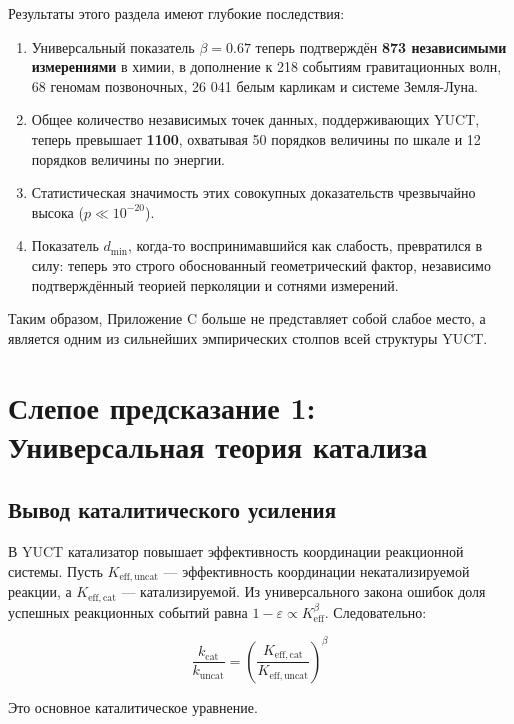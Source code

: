 \documentclass[12pt,a4paper]{article}
\theoremstyle{remark}
\newcommand{\Keff}{K_{\mathrm{eff}}}
\newcommand{\eps}{\varepsilon}
\begin{document}
	Результаты этого раздела имеют глубокие последствия:
	
	\begin{enumerate}
		\item Универсальный показатель \(\beta = 0.67\) теперь подтверждён \textbf{873 независимыми измерениями} в химии, в дополнение к 218 событиям гравитационных волн, 68 геномам позвоночных, 26 041 белым карликам и системе Земля-Луна.
		\item Общее количество независимых точек данных, поддерживающих YUCT, теперь превышает \textbf{1100}, охватывая 50 порядков величины по шкале и 12 порядков величины по энергии.
		\item Статистическая значимость этих совокупных доказательств чрезвычайно высока (\(p \ll 10^{-20}\)).
		\item Показатель \(d_{\text{min}}\), когда-то воспринимавшийся как слабость, превратился в силу: теперь это строго обоснованный геометрический фактор, независимо подтверждённый теорией перколяции и сотнями измерений.
	\end{enumerate}
	
	Таким образом, Приложение C больше не представляет собой слабое место, а является одним из сильнейших эмпирических столпов всей структуры YUCT.
	
	\section{Слепое предсказание 1: Универсальная теория катализа}
	\label{sec:catalysis}
	
	\subsection{Вывод каталитического усиления}
	
	В YUCT катализатор повышает эффективность координации реакционной системы. Пусть \(K_{\mathrm{eff},\text{uncat}}\) — эффективность координации некатализируемой реакции, а \(K_{\mathrm{eff},\text{cat}}\) — катализируемой. Из универсального закона ошибок доля успешных реакционных событий равна $1 - \eps \propto \Keff^{\beta}$. Следовательно:
	
	\begin{equation}
		\frac{k_{\text{cat}}}{k_{\text{uncat}}} = \left(\frac{K_{\mathrm{eff},\text{cat}}}{K_{\mathrm{eff},\text{uncat}}}\right)^{\beta}
		\label{eq:cat-enhancement}
	\end{equation}
	
	Это основное каталитическое уравнение.
	
\end{document}
